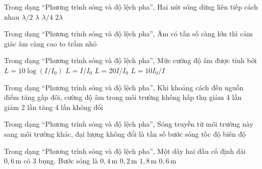 \begin{ex}
Trong dạng “Phương trình sóng và độ lệch pha”, Hai nút sóng dừng liên tiếp cách nhau
\choice
{\True $\lambda/2$}
{$\lambda$}
{$\lambda/4$}
{$2\lambda$}
\end{ex}

\begin{ex}
Trong dạng “Phương trình sóng và độ lệch pha”, Âm có tần số càng lớn thì cảm giác âm càng
\choice
{\True cao}
{to}
{trầm}
{nhỏ}
\end{ex}

\begin{ex}
Trong dạng “Phương trình sóng và độ lệch pha”, Mức cường độ âm được tính bởi
\choice
{\True $L=10\log(I/I_0)$}
{$L=I/I_0$}
{$L=20I/I_0$}
{$L=10I_0/I$}
\end{ex}

\begin{ex}
Trong dạng “Phương trình sóng và độ lệch pha”, Khi khoảng cách đến nguồn điểm tăng gấp đôi, cường độ âm trong môi trường không hấp thụ
\choice
{\True giảm 4 lần}
{giảm 2 lần}
{tăng 4 lần}
{không đổi}
\end{ex}

\begin{ex}
Trong dạng “Phương trình sóng và độ lệch pha”, Sóng truyền từ môi trường này sang môi trường khác, đại lượng không đổi là
\choice
{\True tần số}
{bước sóng}
{tốc độ}
{biên độ}
\end{ex}

\begin{ex}
Trong dạng “Phương trình sóng và độ lệch pha”, Một dây hai đầu cố định dài $0,6\,\text{m}$ có 3 bụng. Bước sóng là
\choice
{\True $0,4\,\text{m}$}
{$0,2\,\text{m}$}
{$1,8\,\text{m}$}
{$0,6\,\text{m}$}
\end{ex}

